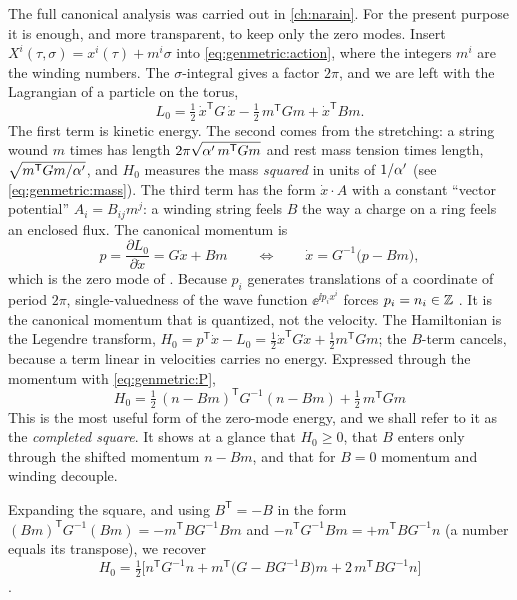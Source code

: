 The full canonical analysis was carried out in \cref{ch:narain}. For the present purpose it
is enough, and more transparent, to keep only the zero modes. Insert
$X^i(\tau,\sigma)=x^i(\tau)+m^i\sigma$ into \eqref{eq:genmetric:action}, where the integers
$m^i$ are the winding numbers. The $\sigma$-integral gives a factor
$2\pi$, and we are left with the Lagrangian of a particle on the torus,
\begin{equation}\label{eq:genmetric:L0}
 L_0=\tfrac12\,\dot x^{\mathsf T}G\,\dot x-\tfrac12\,m^{\mathsf T}Gm+\dot x^{\mathsf T}Bm .
\end{equation}
The first term is kinetic energy. The second comes from the stretching: a string wound
$m$ times has length $2\pi\sqrt{\alpha'\,m^{\mathsf T}Gm}$ and rest mass tension times length,
$\sqrt{m^{\mathsf T}Gm/\alpha'}$, and $H_0$ measures the mass \emph{squared} in units of
$1/\alpha'$ (see \eqref{eq:genmetric:mass}). The third term has the form $\dot x\cdot A$ with a
constant ``vector potential'' $A_i=B_{ij}m^j$: a winding string feels $B$ the way a charge
on a ring feels an enclosed flux. The canonical momentum is
\begin{equation}\label{eq:genmetric:P}
 p=\frac{\partial L_0}{\partial\dot x}=G\dot x+Bm
 \qquad\Longleftrightarrow\qquad \dot x=G^{-1}\big(p-Bm\big),
\end{equation}
which is the zero mode of . Because $p_i$
generates translations of a coordinate of period $2\pi$, single-valuedness of the wave
function $\ee^{\ii p_ix^i}$ forces $p_i=n_i\in\mathbb{Z}$ . It is the canonical momentum that is quantized, not the velocity. The
Hamiltonian is the Legendre transform,
$H_0=p^{\mathsf T}\dot x-L_0=\tfrac12\dot x^{\mathsf T}G\dot x+\tfrac12m^{\mathsf T}Gm$; the
$B$-term cancels, because a term linear in velocities carries no energy. Expressed through
the momentum with \eqref{eq:genmetric:P},
\begin{equation}\label{eq:genmetric:H0square}
 \boxed{\;H_0=\tfrac12\,(n-Bm)^{\mathsf T}G^{-1}(n-Bm)+\tfrac12\,m^{\mathsf T}Gm\;}
\end{equation}
This is the most useful form of the zero-mode energy, and we shall refer to it as the
\emph{completed square}. It shows at a glance that $H_0\ge0$, that $B$ enters only through
the shifted momentum $n-Bm$, and that for $B=0$ momentum and winding decouple.

Expanding the square, and using $B^{\mathsf T}=-B$ in the form
$(Bm)^{\mathsf T}G^{-1}(Bm)=-m^{\mathsf T}BG^{-1}Bm$ and
$-n^{\mathsf T}G^{-1}Bm=+m^{\mathsf T}BG^{-1}n$ (a number equals its transpose), we recover
\begin{equation}\label{eq:genmetric:H0}
 H_0=\tfrac12\Big[n^{\mathsf T}G^{-1}n+m^{\mathsf T}\big(G-BG^{-1}B\big)m
 +2\,m^{\mathsf T}BG^{-1}n\Big]
\end{equation}
.

